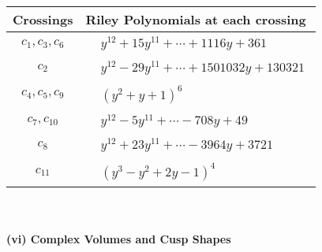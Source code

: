 \documentclass[1p]{elsarticle_modified}
\theoremstyle{definition}
\begin{document}
\begin{tabular}{m{50pt}|m{274pt}}
Crossings & \hspace{64pt}Riley Polynomials at each crossing \\
\hline $$\begin{aligned}c_{1},c_{3},c_{6}\end{aligned}$$&$\begin{aligned}
&y^{12}+15 y^{11}+\cdots+1116 y+361
\end{aligned}$\\
\hline $$\begin{aligned}c_{2}\end{aligned}$$&$\begin{aligned}
&y^{12}-29 y^{11}+\cdots+1501032 y+130321
\end{aligned}$\\
\hline $$\begin{aligned}c_{4},c_{5},c_{9}\end{aligned}$$&$\begin{aligned}
&(y^2+y+1)^6
\end{aligned}$\\
\hline $$\begin{aligned}c_{7},c_{10}\end{aligned}$$&$\begin{aligned}
&y^{12}-5 y^{11}+\cdots-708 y+49
\end{aligned}$\\
\hline $$\begin{aligned}c_{8}\end{aligned}$$&$\begin{aligned}
&y^{12}+23 y^{11}+\cdots-3964 y+3721
\end{aligned}$\\
\hline $$\begin{aligned}c_{11}\end{aligned}$$&$\begin{aligned}
&(y^3- y^2+2 y-1)^4
\end{aligned}$\\
\hline
\end{tabular}\\~\\
\newpage\flushleft \textbf{(vi) Complex Volumes and Cusp Shapes}
\end{document}
